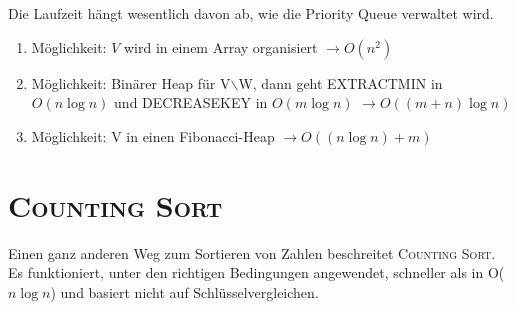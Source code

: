 \documentclass[ngerman,draft,parskip=half*,twoside]{scrreprt}
\theoremstyle{break}
\begin{document}
Die Laufzeit hängt wesentlich davon ab, wie die Priority Queue verwaltet wird.
\begin{enumerate}
\item Möglichkeit: $V$ wird in einem Array organisiert \hfill $\rightarrow O(n^{2})$
\item Möglichkeit: Binärer Heap für V$\backslash$W, dann geht EXTRACTMIN in $O(n\log n)$ und DECREASEKEY in $O(m\log n)$ \hfill $\rightarrow O((m+n)\log n)$
\item Möglichkeit: V in einen Fibonacci-Heap \hfill $\rightarrow O((n \log n)+m)$
\end{enumerate} 
%
%
  \section{\textsc{Counting Sort}}
  Einen ganz anderen Weg zum Sortieren von Zahlen beschreitet \textsc{Counting Sort}.
  Es funktioniert, unter den richtigen Bedingungen angewendet, schneller als in O($n \log n$) und basiert nicht auf
  Schlüsselvergleichen.
\end{document}
